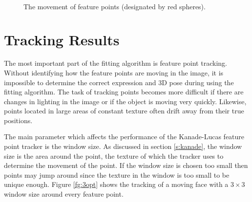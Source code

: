 \documentclass[11pt,a4paper,twoside]{report}
\begin{document}
\begin{figure}[H]
\centering
{}\\

\caption{The movement of feature points (designated by red spheres).}\label{fg:featureinter}
\end{figure}



\section{Tracking Results}
The most important part of the fitting algorithm is feature point
tracking. Without identifying how the feature points are moving in the image, it
is impossible to determine the correct expression and 3D pose during using the
fitting algorithm. The task of tracking points becomes more difficult if there
are changes in lighting in the image or if the object is moving very
quickly. Likewise, points located in large areas of constant texture often drift
away from their true positions. 

The main parameter which affects the performance of the Kanade-Lucas feature
point tracker is the window size. As discussed in section \ref{s:kanade}, the
window size is the area around the point, the texture of which the tracker uses
to determine the movement of the point. If the window size is chosen too small
then points may jump around since the texture in the window is too small to be
unique enough. Figure \ref{fg:3opt} shows the tracking of a moving face with
a $3 \times 3$ window size around every feature point.
\end{document}
